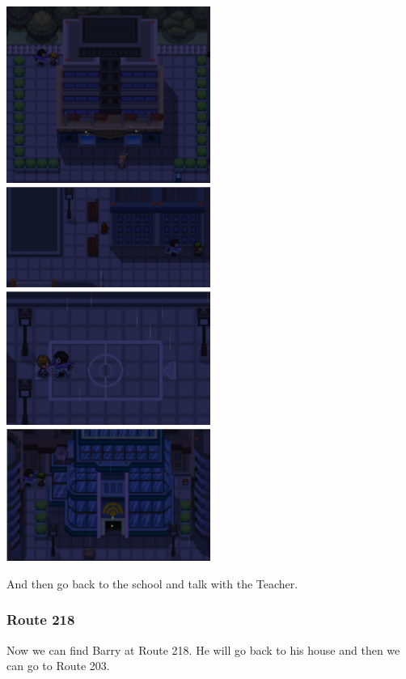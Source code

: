 \documentclass[11pt]{article}
\begin{document}
\includegraphics[width=0.5\textwidth]{walkthrough/Sinnoh/Jubilife-student-1}
\includegraphics[width=0.5\textwidth]{walkthrough/Sinnoh/Jubilife-student-2}
\includegraphics[width=0.5\textwidth]{walkthrough/Sinnoh/Jubilife-student-3}
\includegraphics[width=0.5\textwidth]{walkthrough/Sinnoh/Jubilife-student-4}

And then go back to the school and talk with the Teacher.

\subsubsection{Route 218}\label{subsubsec:route_218}
Now we can find Barry at Route 218.
He will go back to his house and then we can go to Route 203.
\end{document}

